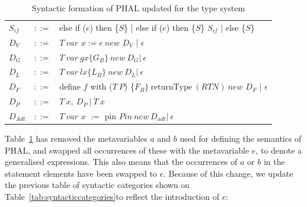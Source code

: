 \begin{table}[H]
\begin{tabular}{@{}lll@{}}
$S_{if}$     & $::=$ &  else if ($e$) then \{$S$\} | else if ($e$) then \{$S$\} $S_{if}$ |  else \{$S$\} \\
$D_V$       & $::=$ & $T \: var$ $x := e \: \textit{new}$ $D_V$ | $\epsilon$ \\
$D_G$       & $::=$ & $T \: var \: gx\{ G_B \} \: \textit{new} \: D_G | \: \epsilon$ \\
$D_L$     & $::=$ &  $T \: var \: lx\{ L_B \} \: \textit{new} \: D_L | \: \epsilon$ \\
$D_F$       & $::=$ & define $f$ with ($T \: P$) \{$F_B\} \: \text{returnType} \: (RTN) \: \textit{new}$ $D_F$ | $\epsilon$ \\
$D_P$  & $::=$ &  $T \: x, \: D_P \: | \: T \: x $  \\
$D_{Adt}$   & $::=$ & $T \: var$ $x$ $:=$ pin $Pin \: new \: D_{adt} | \: \epsilon  $\\
\bottomrule
\end{tabular}
\caption{Syntactic formation of PHAL updated for the type system}
\label{tab:syntacticformationtypes}
\end{table}
\noindent
Table~\ref{tab:syntacticformationtypes} has removed the metavariables $a$ and $b$ used for defining the semantics of PHAL, and swapped all occurrences of these with the metavariable $e$, to denote a generalised expressions. This also means that the occurrences of $a$ or $b$ in the statement elements have been swapped to $e$. Because of this change, we update the previous table of syntactic categories shown on Table~\ref{tab:syntacticcategories}to reflect the introduction of $e$:
